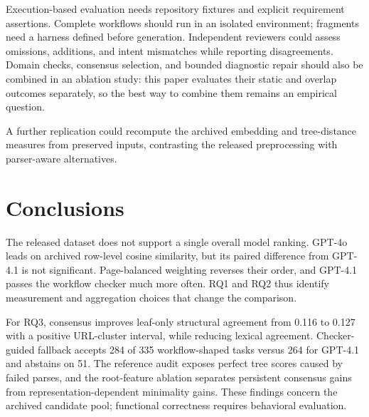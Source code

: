 Execution-based evaluation needs repository fixtures and explicit requirement assertions. Complete workflows should run in an isolated environment; fragments need a harness defined before generation. Independent reviewers could assess omissions, additions, and intent mismatches while reporting disagreements. Domain checks, consensus selection, and bounded diagnostic repair should also be combined in an ablation study: this paper evaluates their static and overlap outcomes separately, so the best way to combine them remains an empirical question.

A further replication could recompute the archived embedding and tree-distance measures from preserved inputs, contrasting the released preprocessing with parser-aware alternatives.

\section{Conclusions}
The released dataset does not support a single overall model ranking. GPT-4o leads on archived row-level cosine similarity, but its paired difference from GPT-4.1 is not significant. Page-balanced weighting reverses their order, and GPT-4.1 passes the workflow checker much more often. RQ1 and RQ2 thus identify measurement and aggregation choices that change the comparison.

For RQ3, consensus improves leaf-only structural agreement from 0.116 to 0.127 with a positive URL-cluster interval, while reducing lexical agreement. Checker-guided fallback accepts 284 of 335 workflow-shaped tasks versus 264 for GPT-4.1 and abstains on 51. The reference audit exposes perfect tree scores caused by failed parses, and the root-feature ablation separates persistent consensus gains from representation-dependent minimality gains. These findings concern the archived candidate pool; functional correctness requires behavioral evaluation.
